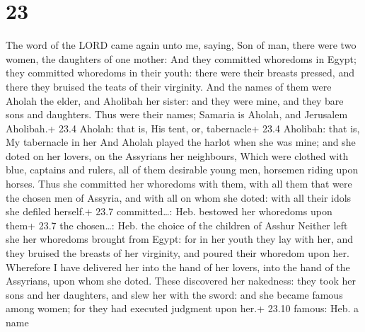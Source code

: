 \hypertarget{section-22}{%
\section{23}\label{section-22}}

 The word of the LORD came again unto me, saying,
 Son of man, there were two women, the daughters of one
mother:  And they committed whoredoms in Egypt; they
committed whoredoms in their youth: there were their breasts pressed,
and there they bruised the teats of their virginity.  And
the names of them were Aholah the elder, and Aholibah her sister: and
they were mine, and they bare sons and daughters. Thus were their names;
Samaria is Aholah, and Jerusalem Aholibah.+ 23.4 Aholah: that is, His
tent, or, tabernacle+ 23.4 Aholibah: that is, My tabernacle in her
 And Aholah played the harlot when she was mine; and she
doted on her lovers, on the Assyrians her neighbours,  Which
were clothed with blue, captains and rulers, all of them desirable young
men, horsemen riding upon horses.  Thus she committed her
whoredoms with them, with all them that were the chosen men of Assyria,
and with all on whom she doted: with all their idols she defiled
herself.+ 23.7 committed\ldots: Heb. bestowed her whoredoms upon them+
23.7 the chosen\ldots: Heb. the choice of the children of Asshur
 Neither left she her whoredoms brought from Egypt: for in
her youth they lay with her, and they bruised the breasts of her
virginity, and poured their whoredom upon her.  Wherefore I
have delivered her into the hand of her lovers, into the hand of the
Assyrians, upon whom she doted.  These discovered her
nakedness: they took her sons and her daughters, and slew her with the
sword: and she became famous among women; for they had executed judgment
upon her.+ 23.10 famous: Heb. a name

